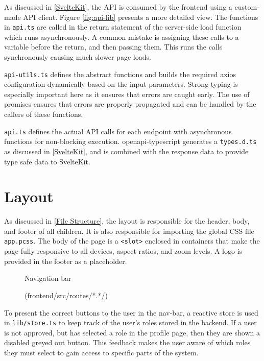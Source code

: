 As discussed in \ref{SvelteKit}, the API is consumed by the frontend using a custom-made API client. Figure \ref{fig:api-lib} presents a more detailed view. The functions in \texttt{api.ts} are called in the return statement of the server-side load function which runs asynchronously. A common mistake is assigning these calls to a variable before the return, and then passing them. This runs the calls synchronously causing much slower page loads.

\texttt{api-utils.ts} defines the abstract functions and builds the required axios configuration dynamically based on the input parameters. Strong typing is especially important here as it ensures that errors are caught early. The use of promises ensures that errors are properly propagated and can be handled by the callers of these functions.

\texttt{api.ts} defines the actual API calls for each endpoint with asynchronous functions for non-blocking execution. openapi-typescript generates a \texttt{types.d.ts} as discussed in \ref{SvelteKit}, and is combined with the response data to provide type safe data to SvelteKit.

\section{Layout}
As discussed in \ref{File Structure}, the layout is responsible for the header, body, and footer of all children. It is also responsible for importing the global CSS file \texttt{app.pcss}. The body of the page is a \texttt{<slot>} enclosed in containers that make the page fully responsive to all devices, aspect ratios, and zoom levels. A logo is provided in the footer as a placeholder. 
\begin{figure}[h]
\centering
{}
\vspace{-20pt}
\caption{Navigation bar}
\vspace{-10pt}
\caption*{(frontend/src/routes/*.*/)}
\label{fig:nav}
\vspace{-15pt}
\end{figure}

To present the correct buttons to the user in the nav-bar, a reactive store is used in \texttt{lib/store.ts} to keep track of the user's roles stored in the backend. If a user is not approved, but has selected a role in the profile page, then they are shown a disabled greyed out button. This feedback makes the user aware of which roles they must select to gain access to specific parts of the system.

